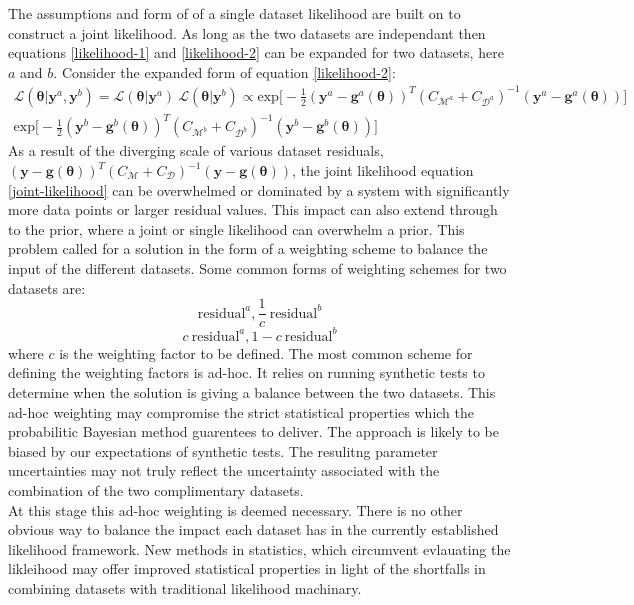 The assumptions and form of of a single dataset likelihood are built on to construct a joint likelihood. As long as the two datasets are independant then equations \ref{likelihood-1} and \ref{likelihood-2} can be expanded for two datasets, here $a$ and $b$. Consider the expanded form of equation \ref{likelihood-2}:
\begin{multline}
\mathcal{L}(\bm{\theta}|\bm{y}^a,\bm{y}^b) = \mathcal{L}(\bm{\theta}|\bm{y}^a)\ \mathcal{L}(\bm{\theta}|\bm{y}^b)
\propto \text{exp}\bigg[-\frac{1}{2}(\bm{y}^a-\bm{g}^a(\bm{\theta}))^T(C_{\mathcal{M}^a}+C_{\mathcal{D}^a})^{-1}(\bm{y}^a-\bm{g}^a(\bm{\theta}))\bigg]\ \\
\text{exp}\bigg[-\frac{1}{2}(\bm{y}^b-\bm{g}^b(\bm{\theta}))^T(C_{\mathcal{M}^b}+C_{\mathcal{D}^b})^{-1}(\bm{y}^b-\bm{g}^b(\bm{\theta}))\bigg]
\label{joint-likelihood}
\end{multline}
As a result of the diverging scale of various dataset residuals, $(\bm{y}-\bm{g}(\bm{\theta}))^T(C_{\mathcal{M}}+C_{\mathcal{D}})^{-1}(\bm{y}-\bm{g}(\bm{\theta}))$, the joint likelihood equation \ref{joint-likelihood} can be overwhelmed or dominated by a system with significantly more data points or larger residual values. This impact can also extend through to the prior, where a joint or single likelihood can overwhelm a prior. This problem called for a solution in the form of a weighting scheme to balance the input of the different datasets. Some common forms of weighting schemes for two datasets are:
\begin{equation}
\text{residual}^a, \frac{1}{c}\ \text{residual}^b
\end{equation}
\begin{equation}
c\ \text{residual}^a, 1-c\ \text{residual}^b
\end{equation}
where $c$ is the weighting factor to be defined. The most common scheme for defining the weighting factors is ad-hoc. It relies on running synthetic tests to determine when the solution is giving a balance between the two datasets. This ad-hoc weighting may compromise the strict statistical properties which the probabilitic Bayesian method guarentees to deliver. The approach is likely to be biased by our expectations of synthetic tests. The resulitng parameter uncertainties may not truly reflect the uncertainty associated with the combination of the two complimentary datasets. \\

At this stage this ad-hoc weighting is deemed necessary. There is no other obvious way to balance the impact each dataset has in the currently established likelihood framework. New methods in statistics, which circumvent evlauating the likleihood may offer improved statistical properties in light of the shortfalls in combining datasets with traditional likelihood machinary. \\

